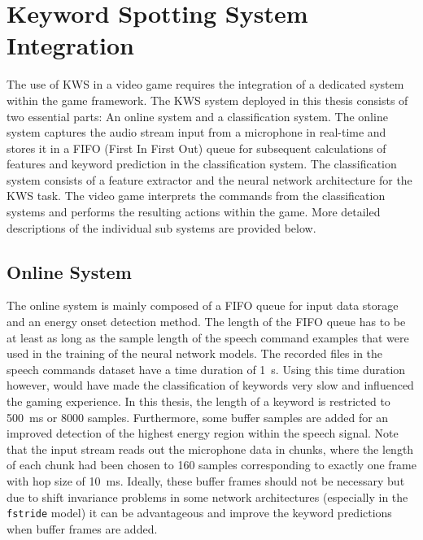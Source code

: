 
\section{Keyword Spotting System Integration}
The use of KWS in a video game requires the integration of a dedicated system within the game framework.
The KWS system deployed in this thesis consists of two essential parts: An online system and a classification system.
The online system captures the audio stream input from a microphone in real-time and stores it in a FIFO (First In First Out) queue for subsequent calculations of features and keyword prediction in the classification system.
The classification system consists of a feature extractor and the neural network architecture for the KWS task.
The video game interprets the commands from the classification systems and performs the resulting actions within the game.
More detailed descriptions of the individual sub systems are provided below.



\subsection{Online System}
The online system is mainly composed of a FIFO queue for input data storage and an energy onset detection method.
The length of the FIFO queue has to be at least as long as the sample length of the speech command examples that were used in the training of the neural network models.
The recorded files in the speech commands dataset have a time duration of \SI{1}{\second}. 
Using this time duration however, would have made the classification of keywords very slow and influenced the gaming experience.
In this thesis, the length of a keyword is restricted to \SI{500}{\milli\second} or 8000 samples.
Furthermore, some buffer samples are added for an improved detection of the highest energy region within the speech signal.
Note that the input stream reads out the microphone data in chunks, where the length of each chunk had been chosen to 160 samples corresponding to exactly one frame with hop size of \SI{10}{\milli\second}.
Ideally, these buffer frames should not be necessary but due to shift invariance problems in some network architectures (especially in the \texttt{fstride} model) it can be advantageous and improve the keyword predictions when buffer frames are added.

